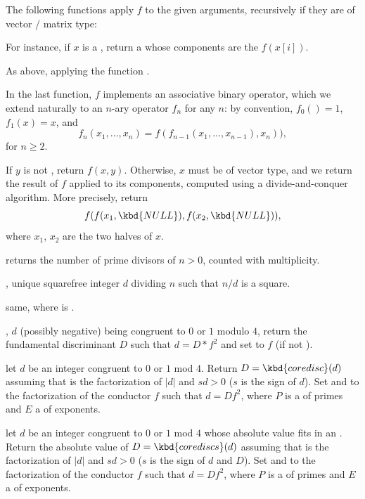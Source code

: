 The following functions apply $f$ to the given arguments, recursively
if they are of vector / matrix type:

 For instance, if $x$ is a
, return a  whose components are the $f(x[i])$.

 As above, applying the
function .



In the last function, $f$ implements an associative binary operator, which we
extend naturally to an $n$-ary operator $f_n$ for any $n$: by convention,
$f_0() = 1$, $f_1(x) = x$, and
$$ f_n(x_1,\dots,x_n) = f( f_{n-1}(x_1,\dots,x_{n-1}), x_n)),$$
for $n \geq 2$.

 If $y$ is not
, return $f(x,y)$. Otherwise, $x$ must be of vector type, and we
return the result of $f$ applied to its components, computed using a
divide-and-conquer algorithm. More precisely, return
$$f( f(x_1,\kbd{NULL}), f(x_2,\kbd{NULL}) ),$$
where $x_1$, $x_2$ are the two halves of $x$.


 returns the number of prime divisors of $n >
0$, counted with multiplicity.

, unique squarefree integer $d$ dividing $n$ such
that $n/d$ is a square.

 same, where  is .

, $d$ (possibly negative)
being congruent to $0$ or $1$ modulo $4$, return the fundamental
discriminant $D$ such that $d=D*f^2$ and set  to $f$
(if  not ).

 let $d$ be an
integer congruent to $0$ or $1$ mod $4$. Return
$D = \kbd{coredisc}(d)$ assuming that  is the factorization of $|d|$
and $s d > 0$ ($s$ is the sign of $d$). Set  and  to the
factorization of the conductor $f$ such that $d = Df^2$, where $P$ is a
 of primes and $E$ a  of exponents.

 let $d$ be an
integer congruent to $0$ or $1$ mod $4$ whose absolute value fits in an
. Return the absolute value of $D = \kbd{corediscs}(d)$ assuming
that  is the factorization of $|d|$ and $s d > 0$ ($s$ is the sign of
$d$ and $D$). Set  and  to the factorization of the
conductor $f$ such that $d = Df^2$, where $P$ is a  of primes
and $E$ a  of exponents.

